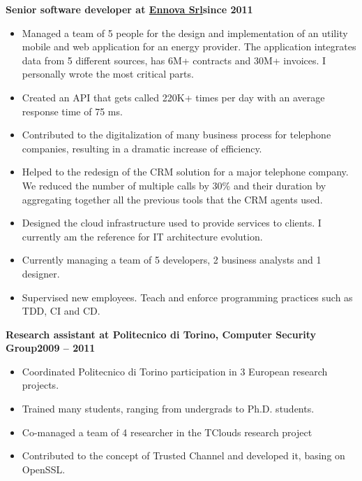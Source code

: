 \documentclass[a4paper,sans,10pt]{moderncv} %
\begin{document}
\renewcommand{\labelitemi}{\tiny$\blacksquare$}
\textbf{Senior software developer at \href{https://www.ennova.it}{Ennova Srl}}\hfill\textbf{since 2011}\\
\vspace{-1em}
  \begin{itemize}
  \item Managed a team of 5 people for the design and implementation of an utility mobile and web application for an energy provider.
  The application integrates data from 5 different sources, has 6M+ contracts and 30M+ invoices.
  I personally wrote the most critical parts.
  \item Created an API that gets called 220K+ times per day with an average response time of 75 ms.
  \item Contributed to the digitalization of many business process for telephone companies, resulting in a dramatic
  increase of efficiency.
  \item Helped to the redesign of the CRM solution for a major telephone company. We reduced the number of multiple calls by 30\%
  and their duration by aggregating together all the previous tools that the CRM agents used.
  \item Designed the cloud infrastructure used to provide services to clients. I currently am the reference for IT architecture evolution.
  \item Currently managing a team of 5 developers, 2 business analysts and 1 designer.
  \item Supervised new employees. Teach and enforce programming practices such as TDD, CI and CD.
  \end{itemize}

\vspace{0.5em}
  \textbf{Research assistant at Politecnico di Torino, Computer Security Group}\hfill\textbf{2009 -- 2011}\\
\vspace{-1em}
  \begin{itemize}
  \item Coordinated Politecnico di Torino participation in 3 European research projects.
  \item Trained many students, ranging from undergrads to Ph.D. students.
  \item Co-managed a team of 4 researcher in the TClouds research project%
  \item Contributed to the concept of Trusted Channel and developed it, basing on OpenSSL.
  \end{itemize}
\end{document}
